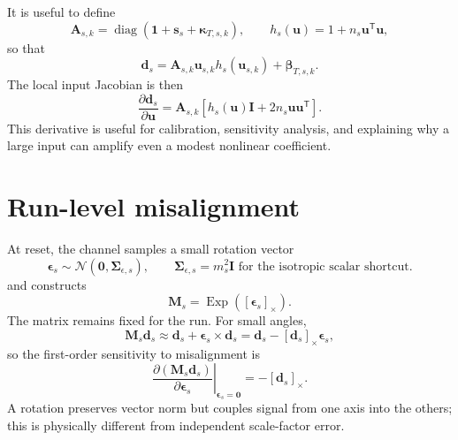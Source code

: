 \documentclass[11pt,oneside,headings=big]{scrreprt}
\newcommand{\Exp}{\operatorname{Exp}}
\newcommand{\skewmat}[1]{\left[#1\right]_{\times}}
\newcommand{\Normal}{\mathcal{N}}
\newcommand{\diag}{\operatorname{diag}}
\newcommand{\transpose}{\mathsf{T}}
\newcommand{\vect}[1]{\bm{#1}}
\newcommand{\mat}[1]{\bm{#1}}
\begin{document}
    It is useful to define
    \begin{equation}
        \mat A_{s,k}=\diag\!\left(\vect1+\vect s_s+\vect\kappa_{T,s,k}\right),
        \qquad
        h_s(\vect u)=1+n_s\vect u^\transpose\vect u,
    \end{equation}
    so that
    \begin{equation}
        \vect d_s=\mat A_{s,k}\vect u_{s,k}h_s(\vect u_{s,k})
        +\vect\beta_{T,s,k}.
        \label{eq:deterministic-matrix}
    \end{equation}
    The local input Jacobian is then
    \begin{equation}
        \frac{\partial\vect d_s}{\partial\vect u}
        =\mat A_{s,k}
        \left[
            h_s(\vect u)\mat I+2n_s\vect u\vect u^\transpose
        \right].
        \label{eq:deterministic-jacobian}
    \end{equation}
    This derivative is useful for calibration, sensitivity analysis, and explaining
    why a large input can amplify even a modest nonlinear coefficient.


    \section{Run-level misalignment}
    At reset, the channel samples a small rotation vector
    \begin{equation}
        \vect\epsilon_s\sim\Normal(\vect0,\mat\Sigma_{\epsilon,s}),
        \qquad
        \mat\Sigma_{\epsilon,s}=m_s^2\mat I
        \text{ for the isotropic scalar shortcut.}
    \end{equation}
    and constructs
    \begin{equation}
        \mat M_s=\Exp\!\left(\skewmat{\vect\epsilon_s}\right).
        \label{eq:misalignment}
    \end{equation}
    The matrix remains fixed for the run. For small angles,
    \begin{equation}
        \mat M_s\vect d_s
        \approx \vect d_s+\vect\epsilon_s\times\vect d_s
        =\vect d_s-\skewmat{\vect d_s}\vect\epsilon_s,
    \end{equation}
    so the first-order sensitivity to misalignment is
    \begin{equation}
        \left.\frac{\partial(\mat M_s\vect d_s)}{\partial\vect\epsilon_s}
        \right|_{\vect\epsilon_s=\vect0}
        =-\skewmat{\vect d_s}.
        \label{eq:misalignment-jacobian}
    \end{equation}
    A rotation preserves vector norm but couples signal from one axis into the
    others; this is physically different from independent scale-factor error.
\end{document}
